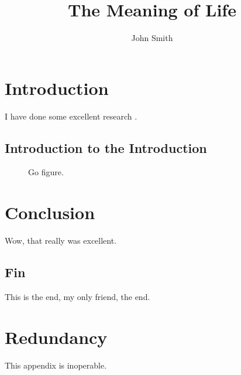 \documentclass[onehalf,11pt]{beavtex}
\title{The Meaning of Life}
\author{John Smith}
\begin{document}
\maketitle

\mainmatter

\chapter{Introduction}
I have done some excellent research \cite{matrix}.
\section{Introduction to the Introduction}
\begin{figure}[!ht]
\centering
{}
\caption{Go figure.}
\end{figure}


\chapter{Conclusion}
Wow, that really was excellent.
\section{Fin}
This is the end, my only friend, the end.





\appendix
\chapter{Redundancy}
This appendix is inoperable.
\end{document}

